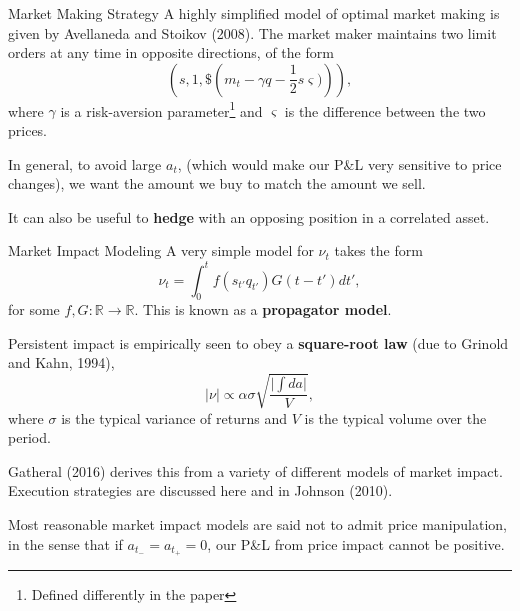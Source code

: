 \documentclass{beamer}
\begin{document}
\begin{frame}{Market Making Strategy}
	A highly simplified model of optimal market making is given by Avellaneda and Stoikov (2008). The market maker maintains two limit orders at any time in opposite directions, of the form
	$$\left(s, 1, \$\left(m_t - \gamma q - \frac{1}{2}s\varsigma)\right)\right),$$
	where $\gamma$ is a risk-aversion parameter\footnote{Defined differently in the paper} and $\varsigma$ is the difference between the two prices.

	In general, to avoid large $a_t$, (which would make our P\&L very sensitive to price changes), we want the amount we buy to match the amount we sell. %

	It can also be useful to \textbf{hedge} with an opposing position in a correlated asset.
\end{frame}

\begin{frame}{Market Impact Modeling}
	A very simple model for $\nu_t$ takes the form
	$$\nu_t = \int_0^t f(s_{t'}q_{t'})G(t-t')dt',$$
	for some $f,G:\mathbb{R}\to\mathbb{R}$. This is known as a \textbf{propagator model}.

	Persistent impact is empirically seen to obey a \textbf{square-root law} (due to Grinold and Kahn, 1994),
	$$\vert\nu\vert \propto \alpha\sigma\sqrt{\frac{\vert \int da\vert}{V}},$$
	where $\sigma$ is the typical variance of returns and $V$ is the typical volume over the period.

	Gatheral (2016) derives this from a variety of different models of market impact. Execution strategies are discussed here and in Johnson (2010).%

	Most reasonable market impact models are said not to admit price manipulation, in the sense that if $a_{t_-}=a_{t_+}=0$, our P\&L from price impact cannot be positive.
\end{frame}
\end{document}

